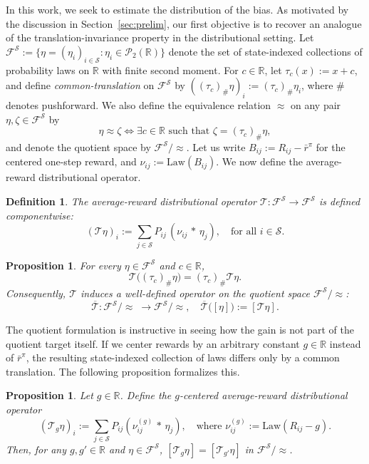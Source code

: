 \documentclass{article}
\newtheorem{proposition}[theorem]{Proposition}
\newtheorem{definition}[theorem]{Definition}
\newcommand{\X}{\mathcal{S}}
\newcommand{\R}{\mathbb{R}}
\begin{document}
In this work, we seek to estimate the distribution of the bias. 
As motivated by the discussion in Section~\ref{sec:prelim}, our first objective is to recover an analogue of the translation-invariance property in the distributional setting. Let $\mathcal F^\X := \{\eta = (\eta_i)_{i \in \X}: \eta_i \in \mathcal P_2(\R)\}$ denote the set of state-indexed collections of probability laws on $\R$ with finite second moment. For $c \in \R$, let $\tau_c(x) := x+c$, and define \emph{common-translation} on $\mathcal F^\X$ by $((\tau_c)_\# \eta)_i := (\tau_c)_\# \eta_i$, where $\#$ denotes pushforward. We also define the equivalence relation $\approx$ on any pair $\eta, \zeta \in \mathcal F^\X$ by
\begin{equation}
\eta \approx \zeta \iff \exists c\in\R \text{ such that } \zeta = (\tau_c)_\#\eta,
\end{equation}
and denote the quotient space by $\mathcal F^\X / \approx$. Let us write $B_{ij} := R_{ij} - \bar r^\pi$ for the centered one-step reward, and $\nu_{ij} := \mathrm{Law}(B_{ij})$. We now define the average-reward distributional operator.
\begin{definition}
The \emph{average-reward distributional operator} $\mathcal T: \mathcal F^\X \to \mathcal F^\X$ is defined componentwise:
\begin{equation}\label{eq:avg-operator}
(\mathcal T \eta)_i := \sum _{j\in \X} P_{ij}\, (\nu_{ij}\,\ast\,\eta_j), \quad \text{for all } i \in \X.
\end{equation}
\end{definition}
\begin{proposition}\label{prop:T}
For every $\eta \in \mathcal F^\X$ and $c \in \R$,
\begin{equation}\label{eq:commute}
\mathcal T\bigl((\tau_c)_\# \eta \bigr) = (\tau_c)_\# \mathcal T\eta.
\end{equation}
Consequently, $\mathcal T$ induces a well-defined operator on the quotient space $\mathcal F^\X / \approx$:
\begin{equation}
\overline {\mathcal T}: \mathcal F^\X / \approx\; \to \mathcal F^\X / \approx, \quad \overline{\mathcal T}\bigl([\eta]\bigr) :=[\mathcal T \eta].
\end{equation}
\end{proposition}

The quotient formulation is instructive in seeing how the gain is not part of the quotient target itself. If we center rewards by an arbitrary constant $g \in \R$ instead of $\bar r^\pi$, the resulting state-indexed collection of laws differs only by a common translation. The following proposition formalizes this.
\begin{proposition}\label{prop:tg}
Let $g \in \R$. Define the \emph{$g$-centered average-reward distributional operator}
\begin{equation}
(\mathcal T_g \eta)_i := \sum_{j\in\X} P_{ij}(\nu_{ij}^{(g)}\,\ast\, \eta_j),\quad\text{where } \nu_{ij}^{(g)}:= \mathrm{Law}(R_{ij} -g).
\end{equation}
Then, for any $g, g' \in \R$ and $\eta \in \mathcal F^\X$, $[\mathcal T_g \eta] = [\mathcal T_{g'} \eta]$ in $\mathcal F^\X / \approx$.
\end{proposition}
\end{document}

